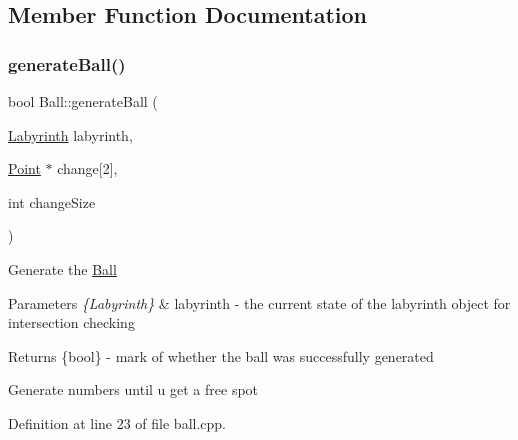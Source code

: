 \subsection{Member Function Documentation}
\mbox{\label{class_ball_a60fd40459426366242d18d85b3b50c2c}} 
\subsubsection{\texorpdfstring{generateBall()}{generateBall()}}
{\footnotesize\ttfamily bool Ball\+::generate\+Ball (\begin{DoxyParamCaption}\item[{\mbox{\hyperlink{class_labyrinth}{Labyrinth}}}]{labyrinth,  }\item[{\mbox{\hyperlink{common_8h_aa9cfdb80b4ca12013a2de8a3b9b97981}{Point}} $\ast$}]{change\mbox{[}2\mbox{]},  }\item[{int}]{change\+Size }\end{DoxyParamCaption})}

Generate the \mbox{\hyperlink{class_ball}{Ball}} 
\begin{DoxyParams}{Parameters}
{\em \{\+Labyrinth\}} & labyrinth -\/ the current state of the labyrinth object for intersection checking \\
\hline
\end{DoxyParams}
\begin{DoxyReturn}{Returns}
\{bool\} -\/ mark of whether the ball was successfully generated 
\end{DoxyReturn}
Generate numbers until u get a free spot

Definition at line 23 of file ball.\+cpp.

